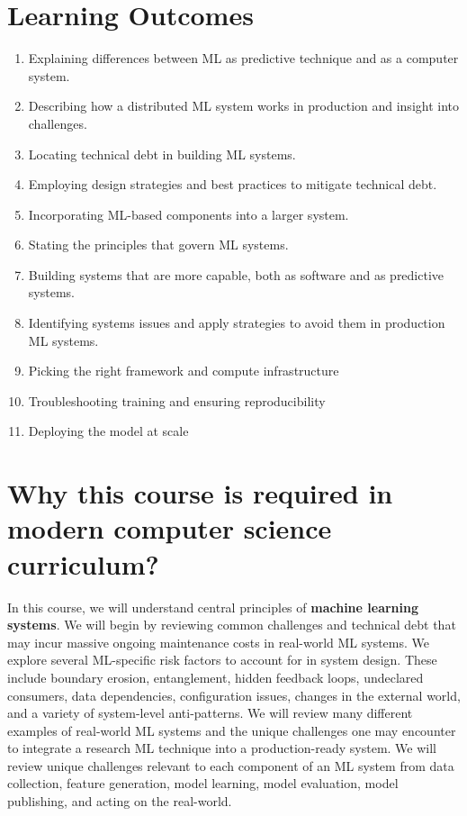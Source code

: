 \documentclass[11pt]{article}
\begin{document}
\section*{Learning Outcomes}
\begin{enumerate}
\item Explaining differences between ML as predictive technique and as a computer system.
\item Describing how a distributed ML system works in production and insight into challenges.
\item Locating technical debt in building ML systems.
\item Employing design strategies and best practices to mitigate technical debt.
\item Incorporating ML-based components into a larger system.
\item Stating the principles that govern ML systems.
\item Building systems that are more capable, both as software and as predictive systems.
\item Identifying systems issues and apply strategies to avoid them in production ML systems.
\item Picking the right framework and compute infrastructure
\item Troubleshooting training and ensuring reproducibility
\item Deploying the model at scale

\end{enumerate}


\section*{Why this course is required in modern computer science curriculum?}

In this course, we will understand central principles of \textbf{machine learning systems}. We will begin by reviewing common challenges and technical debt that may incur massive ongoing maintenance costs in real-world ML systems. We explore several ML-specific risk factors to account for in system design. These include boundary erosion, entanglement, hidden feedback loops, undeclared consumers, data dependencies, configuration issues, changes in the external world, and a variety of system-level anti-patterns. We will review many different examples of real-world ML systems and the unique challenges one may encounter to integrate a research ML technique into a production-ready system. We will review unique challenges relevant to each component of an ML system from data collection, feature generation, model learning, model evaluation, model publishing, and acting on the real-world. 
\end{document}
